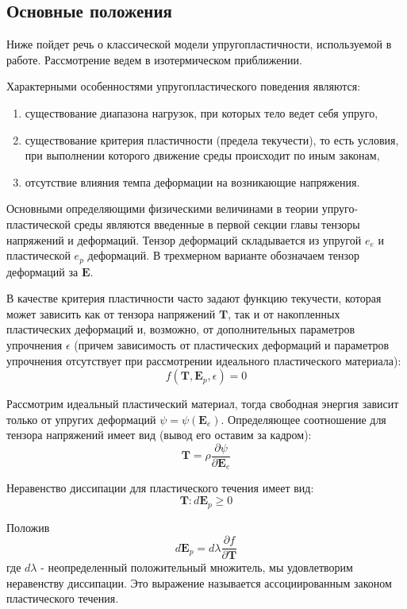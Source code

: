 \documentclass[12pt,a4paper, titlepage, openany]{book}
\begin{document}
\subsection{Основные положения}
Ниже пойдет речь о классической модели упругопластичности, используемой в работе. Рассмотрение ведем в изотермическом приближении.
\par
Характерными особенностями упругопластического поведения являются:
\begin{enumerate}
\item существование диапазона нагрузок, при которых тело ведет себя упруго,
\item существование критерия пластичности (предела текучести), то есть условия, при выполнении которого движение среды происходит по иным законам,
\item отсутствие влияния темпа деформации на возникающие напряжения.
\end{enumerate}
\par
Основными определяющими физическими величинами в теории упруго-пластической среды являются введенные в первой секции главы тензоры напряжений и деформаций. Тензор деформаций складывается из упругой $e_e$ и пластической $e_p$ деформаций. В трехмерном варианте обозначаем тензор деформаций за $\mathbf{E}$.
\par
В качестве критерия пластичности часто задают функцию текучести, которая может зависить как от тензора напряжений $\mathbf{T}$, так и от накопленных пластических деформаций и, возможно, от дополнительных параметров упрочнения $\epsilon$ (причем зависимость от пластических деформаций и параметров упрочнения отсутствует при рассмотрении идеального пластического материала):
\begin{equation}
f(\mathbf{T}, \mathbf{E}_p, \epsilon) = 0
\end{equation}
\par
Рассмотрим идеальный пластический материал, тогда свободная энергия зависит только от упругих деформаций $\psi = \psi(\mathbf{E}_e)$. Определяющее соотношение для тензора напряжений имеет вид (вывод его оставим за кадром):
\begin{equation}
\mathbf{T} = \rho \frac{\partial \psi}{\partial \mathbf{E}_e}
\end{equation}
\par
Неравенство диссипации для пластического течения имеет вид:
\begin{equation}
\mathbf{T}:d\mathbf{E}_p \geq 0
\end{equation}
\par
Положив
\begin{equation}
d\mathbf{E}_p = d \lambda \frac{\partial f}{\partial \mathbf{T}}
\end{equation}
где $d \lambda$ - неопределенный положительный множитель, мы удовлетворим неравенству диссипации. Это выражение называется ассоциированным законом пластического течения.
\end{document}
